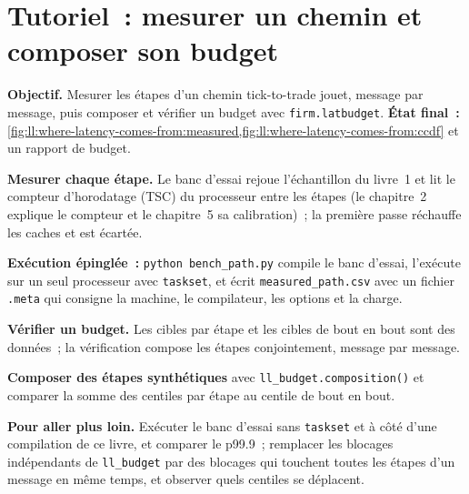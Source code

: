 \section{Tutoriel~: mesurer un chemin et composer son budget}\label{tut:ll:where-latency-comes-from:tut}

\begin{tutorial}
\textbf{Objectif.} Mesurer les étapes d'un chemin tick-to-trade jouet, message par message, puis composer et vérifier un budget avec
\texttt{firm.latbudget}. \textbf{État final~:} \cref{fig:ll:where-latency-comes-from:measured,fig:ll:where-latency-comes-from:ccdf}
et un rapport de budget.
\begin{tutsteps}
\item \textbf{Mesurer chaque étape.} Le banc d'essai rejoue l'échantillon du livre~1 et lit le compteur d'horodatage (TSC) du processeur
entre les étapes (le chapitre~2 explique le compteur et le chapitre~5 sa calibration)~; la première passe réchauffe les caches et est
écartée.
\label{lst:ll:where-latency-comes-from:bench}
\item \textbf{Exécution épinglée~:} \texttt{python bench\_path.py} compile le banc d'essai, l'exécute sur un seul processeur avec
\texttt{taskset}, et écrit \texttt{measured\_path.csv} avec un fichier \texttt{.meta} qui consigne la machine, le
compilateur, les options et la charge.
\item \textbf{Vérifier un budget.} Les cibles par étape et les cibles de bout en bout sont des données~; la vérification compose les étapes conjointement,
message par message.
\label{lst:ll:where-latency-comes-from:check}
\item \textbf{Composer des étapes synthétiques} avec \texttt{ll\_budget.composition()} et comparer la somme des centiles par étape
au centile de bout en bout.
\end{tutsteps}
\textbf{Pour aller plus loin.} Exécuter le banc d'essai sans \texttt{taskset} et à côté d'une compilation de ce livre, et
comparer le p99.9~; remplacer les blocages indépendants de \texttt{ll\_budget} par des blocages qui touchent toutes les étapes d'un message
en même temps, et observer quels centiles se déplacent.
\end{tutorial}

